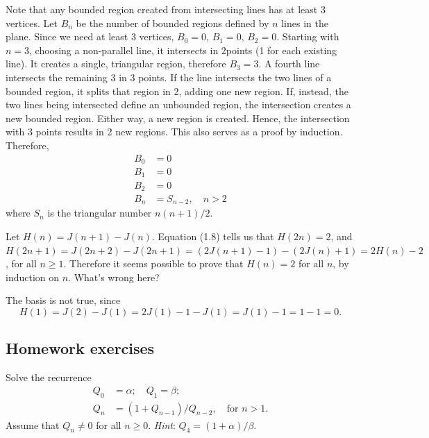 \documentclass[12pt]{article}
\newenvironment{ex}[2][Exercise]{\begin{trivlist}
		\item[\hskip \labelsep {\bfseries #1}\hskip \labelsep {\bfseries #2.}]}{\end{trivlist}}
\newenvironment{sol}[1][Solution]{\begin{trivlist}
		\item[\hskip \labelsep {\bfseries #1:}]}{\end{trivlist}}
\begin{document}
\begin{sol}
	Note that any bounded region created from intersecting lines has at least 3 vertices.
	Let $B_n$ be the number of bounded regions defined by $n$ lines in the plane.
	Since we need at least 3 vertices, $B_0=0$, $B_1=0$, $B_2=0$. Starting with $n=3$,
	choosing a non-parallel line, it intersects in 2points (1 for each existing line).
	It creates a single, triangular region, therefore $B_3=3$. A fourth line intersects
	the remaining 3 in 3 points. If the line intersects the two lines of a bounded
	region, it splits that region in 2, adding one new region. If, instead,
	the two lines being intersected define an unbounded region, the intersection
	creates a new bounded region. Either way, a new region is created.
	Hence, the intersection with $3$ points results in 2 new regions. This also serves
	as a proof by induction. Therefore,
	\begin{align*}
		B_0&=0\\
		B_1&=0\\
		B_2&=0\\
		B_{n}&=S_{n-2},\quad n>2
	\end{align*}
	where $S_n$ is the triangular number $n(n+1)/2$.
\end{sol}

\begin{ex}{7}
	Let $H(n)=J(n+1)-J(n)$. Equation (1.8) tells us that $H(2n)=2$, and
	$H(2n+1)=J(2n+2)-J(2n+1)=(2J(n+1)-1)-(2J(n)+1)=2H(n)-2$, for all $n\geq 1$.
	Therefore it seems possible to prove that $H(n)=2$ for all $n$, by induction
	on $n$. What's wrong here?
\end{ex}

\begin{sol}
	The basis is not true, since
	\[
	H(1)=J(2)-J(1)=2J(1)-1-J(1)=J(1)-1=1-1=0.
	\]
\end{sol}

\subsection*{Homework exercises}
\begin{ex}{8}
	Solve the recurrence 
	\begin{align*}
		Q_0&=\alpha;\quad Q_1=\beta;\\
		Q_n&=(1+Q_{n-1})/Q_{n-2},\quad \text{for } n>1.
	\end{align*}
	Assume that $Q_n\neq 0$ for all $n\geq 0$. \emph{Hint}: $Q_4=(1+\alpha)/\beta$.
\end{ex}
\end{document}
